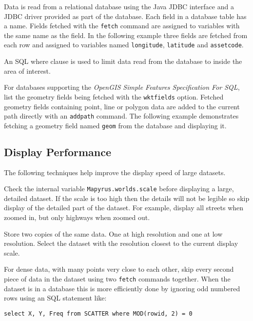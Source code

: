Data is read from a relational database using
the Java JDBC interface and a JDBC driver provided
as part of the database.
Each field in a database table has a name.
Fields fetched with the
\texttt{fetch}
command are assigned to variables with the same name as the field.
In the following example three fields are fetched from each
row and assigned to variables named
\texttt{longitude}, \texttt{latitude} and \texttt{assetcode}.

An SQL where clause is used to limit data read from
the database to inside the area of interest.



For databases supporting the \textit{OpenGIS Simple Features Specification For
SQL}, list the geometry fields being fetched with the \texttt{wktfields}
option.  Fetched geometry fields containing point, line or polygon data are
added to the current path directly with an \texttt{addpath} command.  The
following example demonstrates fetching a geometry field named \texttt{geom}
from the database and displaying it.



\subsection{Display Performance}

The following techniques help improve the display speed of large datasets.

Check the internal variable \texttt{Mapyrus.worlds.scale} before displaying a
large, detailed dataset.  If the scale is too high then the details will not be
legible so skip display of the detailed part of the dataset.  For example,
display all streets when zoomed in, but only highways when zoomed out.

Store two copies of the same data.  One at high resolution and one at low
resolution.  Select the dataset with the resolution closest to the current
display scale.

For dense data, with many points very close to each other, skip every second
piece of data in the dataset using two \texttt{fetch} commands together.  When
the dataset is in a database this is more efficiently done by ignoring odd
numbered rows using an SQL statement like:

\begin{verbatim}
select X, Y, Freq from SCATTER where MOD(rowid, 2) = 0
\end{verbatim}

